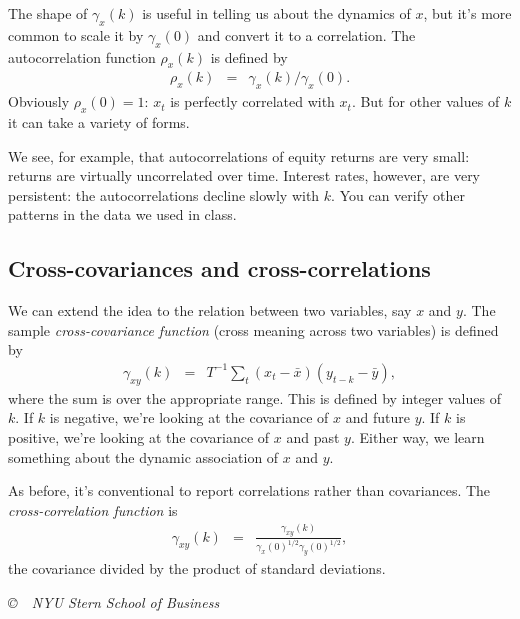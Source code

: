 \documentclass[11pt]{article}
\begin{document}
The shape of $\gamma_x(k)$ is useful in telling us about the dynamics of $x$,
but it's more common to scale it by $\gamma_x(0)$ and convert it to
a correlation.
The autocorrelation function $\rho_x(k)$ is defined by
\begin{eqnarray*}
    \rho_x(k)  &=&  \gamma_x(k)/\gamma_x(0).
\end{eqnarray*}
Obviously $\rho_x(0) = 1$:  $x_t$ is perfectly correlated with $x_t$.
But for other values of $k$ it can take a variety of forms.

We see, for example, that autocorrelations of equity returns are very small:
returns are virtually uncorrelated over time.
Interest rates, however, are very persistent:
the autocorrelations decline slowly with $k$.
You can verify other patterns in the data we used in class.

\subsection*{Cross-covariances and cross-correlations}

We can extend the idea to the relation between two variables, say $x$ and $y$.
The sample {\it cross-covariance function\/} (cross meaning across two variables)
is defined by
\begin{eqnarray*}
    \gamma_{xy}(k)  &=&
            T^{-1} \sum_{t} (x_t - \bar{x}) (y_{t-k} - \bar{y}) ,
\end{eqnarray*}
where the sum is over the appropriate range.
This is defined by integer values of $k$.
If $k$ is negative, we're looking at the covariance of
$x$ and future $y$.
If $k$ is positive, we're looking at the covariance of
$x$ and past $y$.
Either way, we learn something about the dynamic association of $x$ and $y$.

As before, it's conventional to report correlations rather than covariances.
The {\it cross-correlation function\/} is
\begin{eqnarray*}
    \gamma_{xy}(k)  &=&  \frac{\gamma_{xy}(k)}{\gamma_{x}(0)^{1/2}\gamma_{y}(0)^{1/2}} ,
\end{eqnarray*}
the covariance divided by the product of standard deviations.

\vfill \centerline{\it \copyright \ \number\year \
NYU Stern School of Business}
\end{document}

